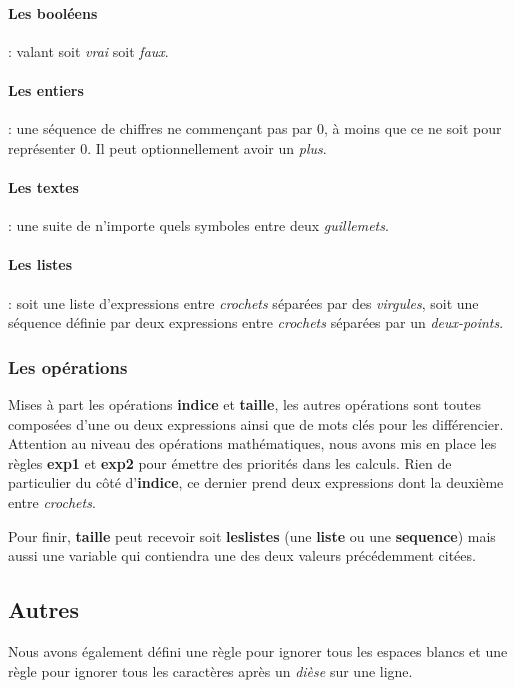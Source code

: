 \paragraph{Les booléens}: valant soit \textit{vrai} soit \textit{faux}.

\paragraph{Les entiers}: une séquence de chiffres ne commençant pas par 0, à moins que ce ne soit pour représenter 0. Il peut optionnellement avoir un \textit{plus}.%

\paragraph{Les textes}: une suite de n'importe quels symboles entre deux \textit{guillemets}.

\paragraph{Les listes}: soit une liste d'expressions entre \textit{crochets} séparées par des \textit{virgules}, soit une séquence définie par deux expressions entre \textit{crochets} séparées par un \textit{deux-points}. 

\subsubsection{Les opérations}
Mises à part les opérations \textbf{indice} et \textbf{taille}, les autres opérations sont toutes composées d'une ou deux expressions ainsi que de mots clés pour les différencier. 
Attention au niveau des opérations mathématiques, nous avons mis en place les règles \textbf{exp1} et \textbf{exp2} pour émettre des priorités dans les calculs.
Rien de particulier du côté d'\textbf{indice}, ce dernier prend deux expressions dont la deuxième entre \textit{crochets}.

Pour finir, \textbf{taille} peut recevoir soit \textbf{leslistes} (une \textbf{liste} ou une \textbf{sequence})
mais aussi une variable qui contiendra une des deux valeurs précédemment citées.

\subsection{Autres}
Nous avons également défini une règle pour ignorer tous les espaces blancs et une règle pour ignorer tous les caractères après un \textit{dièse} sur une ligne.

